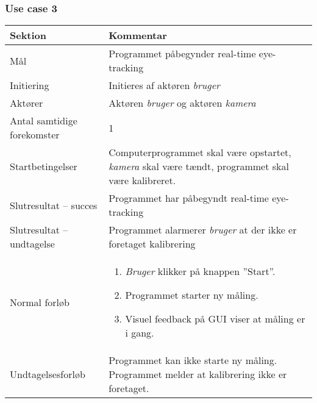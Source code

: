 \documentclass[rapport.tex]{subfiles}
\begin{document}
		\subsubsection{Use case 3}
		\begin{tabular}{|l|p{7.7cm}|}
			\hline \textbf{Sektion} 	& \textbf{Kommentar} \\ 
			\hline Mål  & Programmet påbegynder real-time eye-tracking \\ 
			\hline Initiering  & Initieres af aktøren \textit{bruger} \\ 
			\hline Aktører & Aktøren \textit{bruger} og aktøren \textit{kamera} \\ 
			\hline Antal samtidige forekomster & 1 \\ 
			\hline Startbetingelser & Computerprogrammet skal være opstartet, \textit{kamera} skal være tændt, programmet skal være kalibreret. \\ 
			\hline Slutresultat – succes & Programmet har påbegyndt real-time eye-tracking\\ 
			\hline Slutresultat – undtagelse & Programmet alarmerer \textit{bruger} at der ikke er foretaget kalibrering \\ 
			\hline Normal forløb & \begin{enumerate}
				\item \textit{Bruger} klikker på knappen ”Start”.
				\item Programmet starter ny måling.
				\item Visuel feedback på GUI viser at måling er i gang.
			\end{enumerate} \\  
			\hline Undtagelsesforløb & Programmet kan ikke starte ny måling. Programmet melder
			at kalibrering ikke er foretaget.\\
			\hline 
		\end{tabular}
\end{document}
